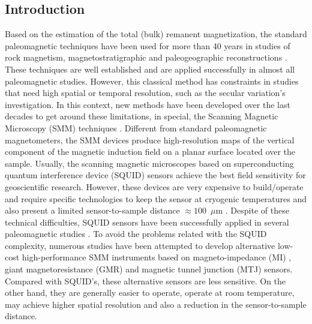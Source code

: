 \documentclass[draft,gc]{agutex}
\begin{document}
\begin{article}




\section{Introduction}
\label{sec:Introduction}

Based on the estimation of the total (bulk) remanent magnetization, the standard 
paleomagnetic techniques have been used for more than 40 years in studies of rock magnetism, 
magnetostratigraphic and paleogeographic reconstructions \citep{voo1993}. These techniques 
are well established and are applied successfully in almost all paleomagnetic studies. 
However, this classical method has constraints in studies that need high spatial or 
temporal resolution, such as the secular variation's investigation. In this context, new 
methods have been developed over the last decades to get around these limitations, in special, 
the Scanning Magnetic Microscopy (SMM) techniques \citep{oda2011, fu2014}. Different from 
standard paleomagnetic magnetometers, the SMM devices produce high-resolution maps of the 
vertical component of the magnetic induction field on a planar surface located over the 
sample. Usually, the scanning magnetic microscopes based on superconducting quantum 
interference device (SQUID) sensors achieve the best field sensitivity for geoscientific 
research. However, these devices are very expensive to build/operate and require specific 
technologies to keep the sensor at cryogenic temperatures and also present a limited 
sensor-to-sample distance $\approx 100$~$\mu$m \citep{baudenbacher2003, fong2005}. 
Despite of these technical difficulties, SQUID sensors have been successfully applied 
in several paleomagnetic studies \citep{gattacceca2006,weiss2007b, oda2011, fu2014}. 
To avoid the problems related with the SQUID complexity, numerous studies have been 
attempted to develop alternative low-cost high-performance SMM instruments based on 
magneto-impedance (MI) \citep{uehara2007, uehara2008}, giant magnetoresistance (GMR) 
\citep{hankard2009} and magnetic tunnel junction (MTJ)\citep{lima2014} sensors. 
Compared with SQUID's, these alternative sensors are less sensitive. On the other 
hand, they are generally easier to operate, operate at room temperature, 
may achieve higher spatial resolution and also a reduction in the sensor-to-sample 
distance.


\end{article}
\end{document}
